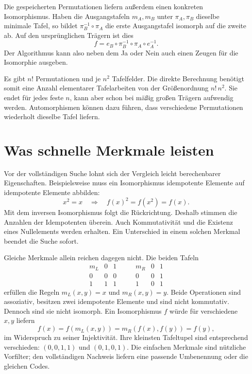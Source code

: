 Die gespeicherten Permutationen liefern außerdem einen konkreten
Isomorphismus. Haben die Ausgangstafeln \(m_A,m_B\) unter
\(\pi_A,\pi_B\) dieselbe minimale Tafel, so bildet
\(\pi_B^{-1}\circ\pi_A\) die erste Ausgangstafel isomorph auf die
zweite ab. Auf den ursprünglichen Trägern ist dies
\[
  f=e_B\circ\pi_B^{-1}\circ\pi_A\circ e_A^{-1}.
\]
Der Algorithmus kann also neben dem Ja oder Nein auch einen Zeugen
für die Isomorphie ausgeben.

Es gibt \(n!\) Permutationen und je \(n^2\) Tafelfelder. Die direkte
Berechnung benötigt somit eine Anzahl elementarer Tafelarbeiten
von der Größenordnung \(n!\,n^2\). Sie endet für jedes feste \(n\),
kann aber schon bei mäßig großen Trägern aufwendig werden.
Automorphismen können dazu führen, dass verschiedene Permutationen
wiederholt dieselbe Tafel liefern.

\section*{Was schnelle Merkmale leisten}

Vor der vollständigen Suche lohnt sich der Vergleich leicht
berechenbarer Eigenschaften. Beispielsweise muss ein Isomorphismus
idempotente Elemente auf idempotente Elemente abbilden:
\[
  x^2=x\quad\Longrightarrow\quad f(x)^2=f(x^2)=f(x).
\]
Mit dem inversen Isomorphismus folgt die Rückrichtung. Deshalb
stimmen die Anzahlen der Idempotenten überein. Auch Kommutativität
und die Existenz eines Nullelements werden erhalten. Ein Unterschied
in einem solchen Merkmal beendet die Suche sofort.

Gleiche Merkmale allein reichen dagegen nicht. Die beiden Tafeln
\[
  \begin{array}{c|cc}
    m_L&0&1\\\hline
    0&0&0\\
    1&1&1
  \end{array}
  \qquad
  \begin{array}{c|cc}
    m_R&0&1\\\hline
    0&0&1\\
    1&0&1
  \end{array}
\]
erfüllen die Regeln \(m_L(x,y)=x\) und \(m_R(x,y)=y\).
Beide Operationen sind assoziativ, besitzen zwei idempotente
Elemente und sind nicht kommutativ. Dennoch sind sie nicht
isomorph. Ein Isomorphismus \(f\) würde für verschiedene \(x,y\)
liefern
\[
  f(x)=f(m_L(x,y))=m_R(f(x),f(y))=f(y),
\]
im Widerspruch zu seiner Injektivität. Ihre kleinsten Tafeltupel
sind entsprechend verschieden: \((0,0,1,1)\) und \((0,1,0,1)\).
Die einfachen Merkmale sind nützliche Vorfilter; den vollständigen
Nachweis liefern eine passende Umbenennung oder die gleichen Codes.

